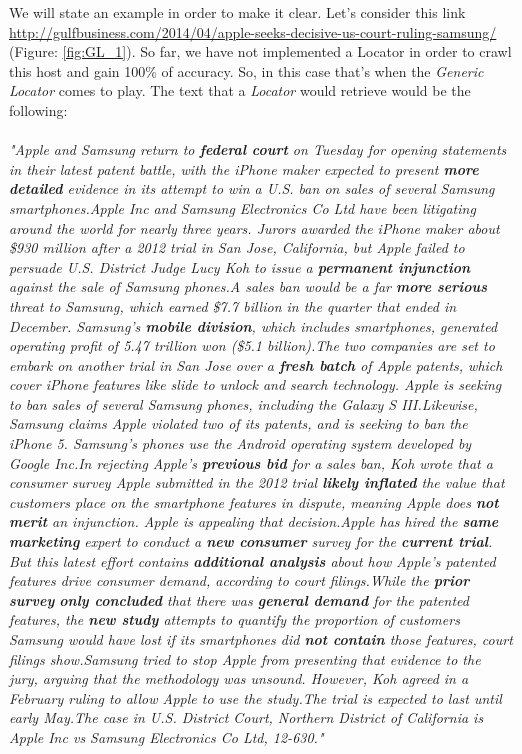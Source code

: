 We will state an example in order to make it clear. Let's consider this link \url{http://gulfbusiness.com/2014/04/apple-seeks-decisive-us-court-ruling-samsung/} (Figure: \ref{fig:GL_1}). So far, we have not implemented a Locator in order to crawl this host and gain 100\% of accuracy. So, in this case that's when the \emph{Generic Locator} comes to play. The text that a \emph{Locator} would retrieve would be the following: 
\\\\
\emph{"Apple and Samsung return to \textbf{federal court} on Tuesday for opening statements in their latest patent battle, with the iPhone maker expected to present \textbf{more detailed} evidence in its attempt to win a U.S. ban on sales of several Samsung smartphones.Apple Inc and Samsung Electronics Co Ltd have been litigating around the world for nearly three years. Jurors awarded the iPhone maker about \$930 million after a 2012 trial in San Jose, California, but Apple failed to persuade U.S. District Judge Lucy Koh to issue a \textbf{permanent injunction} against the sale of Samsung phones.A sales ban would be a far \textbf{more serious} threat to Samsung, which earned \$7.7 billion in the quarter that ended in December. Samsung’s \textbf{mobile division}, which includes smartphones, generated operating profit of 5.47 trillion won (\$5.1 billion).The two companies are set to embark on another trial in San Jose over a \textbf{fresh batch} of Apple patents, which cover iPhone features like slide to unlock and search technology. Apple is seeking to ban sales of several Samsung phones, including the Galaxy S III.Likewise, Samsung claims Apple violated two of its patents, and is seeking to ban the iPhone 5. Samsung’s phones use the Android operating system developed by Google Inc.In rejecting Apple’s \textbf{previous bid} for a sales ban, Koh wrote that a consumer survey Apple submitted in the 2012 trial \textbf{likely inflated} the value that customers place on the smartphone features in dispute, meaning Apple does \textbf{not merit} an injunction. Apple is appealing that decision.Apple has hired the \textbf{same marketing} expert to conduct a \textbf{new consumer} survey for the \textbf{current trial}. But this latest effort contains \textbf{additional analysis} about how Apple’s patented features drive consumer demand, according to court filings.While the \textbf{prior survey} \textbf{only concluded} that there was \textbf{general demand} for the patented features, the \textbf{new study} attempts to quantify the proportion of customers Samsung would have lost if its smartphones did \textbf{not contain} those features, court filings show.Samsung tried to stop Apple from presenting that evidence to the jury, arguing that the methodology was unsound. However, Koh agreed in a February ruling to allow Apple to use the study.The trial is expected to last until early May.The case in U.S. District Court, Northern District of California is Apple Inc vs Samsung Electronics Co Ltd, 12-630."}
